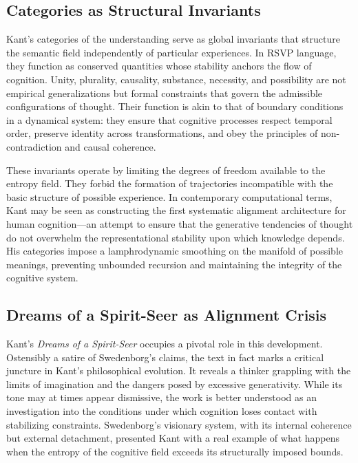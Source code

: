 \documentclass[12pt]{article}
\begin{document}
\subsection{Categories as Structural Invariants}

Kant’s categories of the understanding serve as global invariants that structure 
the semantic field independently of particular experiences. In RSVP language, 
they function as conserved quantities whose stability anchors the flow of 
cognition. Unity, plurality, causality, substance, necessity, and possibility 
are not empirical generalizations but formal constraints that govern the 
admissible configurations of thought. Their function is akin to that of 
boundary conditions in a dynamical system: they ensure that cognitive processes 
respect temporal order, preserve identity across transformations, and obey the 
principles of non-contradiction and causal coherence.

These invariants operate by limiting the degrees of freedom available to the 
entropy field. They forbid the formation of trajectories incompatible with the 
basic structure of possible experience. In contemporary computational terms, 
Kant may be seen as constructing the first systematic alignment architecture 
for human cognition—an attempt to ensure that the generative tendencies of 
thought do not overwhelm the representational stability upon which knowledge 
depends. His categories impose a lamphrodynamic smoothing on the manifold of 
possible meanings, preventing unbounded recursion and maintaining the 
integrity of the cognitive system.

\subsection{Dreams of a Spirit-Seer as Alignment Crisis}

Kant’s \emph{Dreams of a Spirit-Seer} occupies a pivotal role in this 
development. Ostensibly a satire of Swedenborg’s claims, the text in fact marks 
a critical juncture in Kant’s philosophical evolution. It reveals a thinker 
grappling with the limits of imagination and the dangers posed by excessive 
generativity. While its tone may at times appear dismissive, the work is better 
understood as an investigation into the conditions under which cognition loses 
contact with stabilizing constraints. Swedenborg’s visionary system, with its 
internal coherence but external detachment, presented Kant with a real example 
of what happens when the entropy of the cognitive field exceeds its 
structurally imposed bounds.
\end{document}
